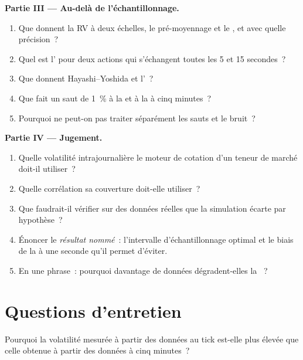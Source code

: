 \begin{problem}
\medskip\noindent\textbf{Partie III --- Au-delà de l'échantillonnage.}
\begin{enumerate}[resume]
\item Que donnent la RV à deux échelles, le pré-moyennage et le , et avec quelle précision~?
\item Quel est l' pour deux actions qui s'échangent toutes les 5 et 15 secondes~?
\item Que donnent Hayashi--Yoshida et l'~?
\item Que fait un saut de 1~\% à la  et à la  à cinq minutes~?
\item Pourquoi ne peut-on pas traiter séparément les sauts et le bruit~?
\end{enumerate}

\medskip\noindent\textbf{Partie IV --- Jugement.}
\begin{enumerate}[resume]
\item Quelle volatilité intrajournalière le moteur de cotation d'un teneur de marché doit-il utiliser~?
\item Quelle corrélation sa couverture doit-elle utiliser~?
\item Que faudrait-il vérifier sur des données réelles que la simulation écarte par hypothèse~?
\item Énoncer le \emph{résultat nommé}~: l'intervalle d'échantillonnage optimal et le biais de la  à une seconde qu'il permet d'éviter.
\item En une phrase~: pourquoi davantage de données dégradent-elles la ~?
\end{enumerate}
\end{problem}

\section{Questions d'entretien}

\begin{interviewq}\label{iq:qm:high-frequency-econometrics:1}
Pourquoi la volatilité mesurée à partir des données au tick est-elle plus élevée que celle obtenue à partir des données à cinq minutes~?
\end{interviewq}


